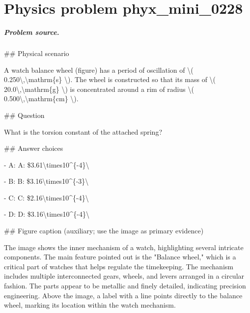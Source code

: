 
\chapter{Physics problem phyx\_mini\_0228}
\label{ch:PhyXMiniProblems_problem_phyx_mini_0228}

\paragraph{Problem source.}
\#\# Physical scenario

A watch balance wheel (figure) has a period of oscillation of \textbackslash{}( 0.250\textbackslash{},\textbackslash{}mathrm\{s\} \textbackslash{}). The wheel is constructed so that its mass of \textbackslash{}( 20.0\textbackslash{},\textbackslash{}mathrm\{g\} \textbackslash{}) is concentrated around a rim of radius \textbackslash{}( 0.500\textbackslash{},\textbackslash{}mathrm\{cm\} \textbackslash{}).

\#\# Question

What is the torsion constant of the attached spring?

\#\# Answer choices

- A: A: \$3.61\textbackslash{}times10\textasciicircum{}\{-4\}\textbackslash{}

- B: B: \$3.16\textbackslash{}times10\textasciicircum{}\{-3\}\textbackslash{}

- C: C: \$2.16\textbackslash{}times10\textasciicircum{}\{-4\}\textbackslash{}

- D: D: \$3.16\textbackslash{}times10\textasciicircum{}\{-4\}\textbackslash{}

\#\# Figure caption (auxiliary; use the image as primary evidence)

The image shows the inner mechanism of a watch, highlighting several intricate components. The main feature pointed out is the "Balance wheel," which is a critical part of watches that helps regulate the timekeeping. The mechanism includes multiple interconnected gears, wheels, and levers arranged in a circular fashion. The parts appear to be metallic and finely detailed, indicating precision engineering. Above the image, a label with a line points directly to the balance wheel, marking its location within the watch mechanism.

